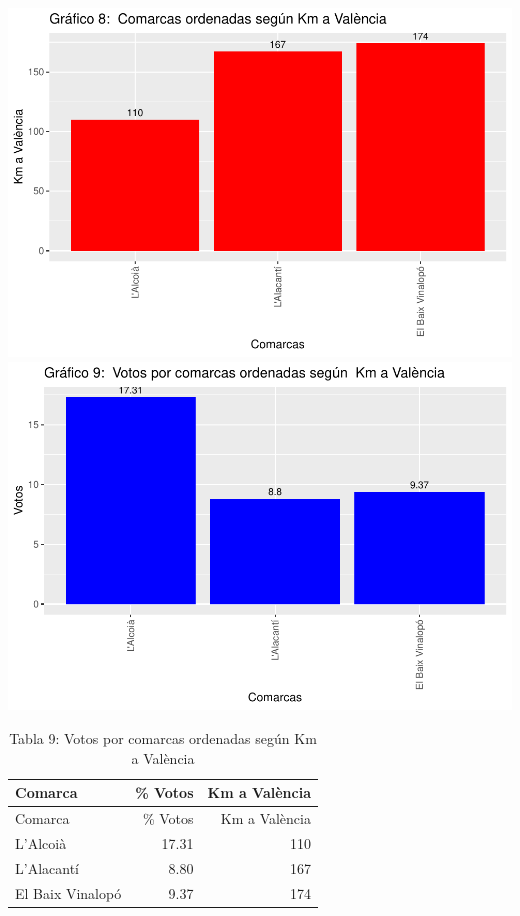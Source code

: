 \documentclass[
]{article}
\begin{document}
\includegraphics{votovalencianista-ea2023_files/figure-latex/ordenDistanciacapitalAlicante-1.pdf}
\includegraphics{votovalencianista-ea2023_files/figure-latex/ordenDistanciacapitalAlicante-2.pdf}

\begin{longtable}[]{@{}lrr@{}}
\caption{Tabla 9: Votos por comarcas ordenadas según Km a
València}\tabularnewline
\toprule\noalign{}
Comarca & \% Votos & Km a València \\
\midrule\noalign{}
\endfirsthead
\toprule\noalign{}
Comarca & \% Votos & Km a València \\
\midrule\noalign{}
\endhead
\bottomrule\noalign{}
\endlastfoot
L'Alcoià & 17.31 & 110 \\
L'Alacantí & 8.80 & 167 \\
El Baix Vinalopó & 9.37 & 174 \\
\end{longtable}
\end{document}

